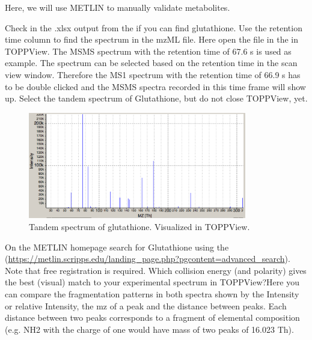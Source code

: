 Here, we will use METLIN to manually validate metabolites.

\begin{task}
Check in the .xlsx output from the  if you can find glutathione. Use the retention time column to find the spectrum in the mzML file. Here open the file in the  in  TOPPView. The MSMS spectrum with the retention time of 67.6 s is used as example. The spectrum can be selected based on the retention time in the scan view window. Therefore the MS1 spectrum with the retention time of 66.9 s has to be double clicked and the MSMS spectra recorded in this time frame will show up. Select the tandem spectrum of Glutathione, but do not close TOPPView, yet.
\end{task} 

\begin{figure}[htbp]
  \centering
  \includegraphics[width=0.85\textwidth]{graphics/metabo/glutathioneTV.png}
  \caption{Tandem spectrum of glutathione. Visualized in TOPPView.}
  \label{fig:glutathioneTandemSpectrum}
\end{figure}

\begin{task}
On the METLIN homepage search for  Glutathione using the  (\url{https://metlin.scripps.edu/landing_page.php?pgcontent=advanced_search}). Note that free registration is required. Which collision energy (and polarity) gives the best (visual) match to your experimental spectrum in TOPPView?Here you can compare the fragmentation patterns in both spectra shown by the Intensity or relative Intensity, the mz of a peak and the distance between peaks. Each distance between two peaks corresponds to a fragment of elemental composition (e.g. NH2 with the charge of one would have mass of two peaks of 16.023 Th).
\end{task}

